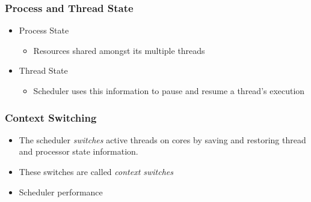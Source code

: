 \documentclass{beamer}
\begin{document}
\begin{frame}
\frametitle{Process and Thread State}
\begin{itemize}
\item Process State

\begin{itemize}
	\item[] Resources shared amongst its multiple threads
\end{itemize}

\item Thread State

\begin{itemize}
	\item[] Scheduler uses this information to pause and resume a thread's execution
\end{itemize}
\end{itemize}
\end{frame}

\begin{frame}
\frametitle{Context Switching}
\begin{itemize}
\item The scheduler \emph{switches} active threads on cores by saving and restoring thread and processor state information.
\item These switches are called \emph{context switches}
\item Scheduler performance 
\end{itemize}
\end{frame}
\end{document}
